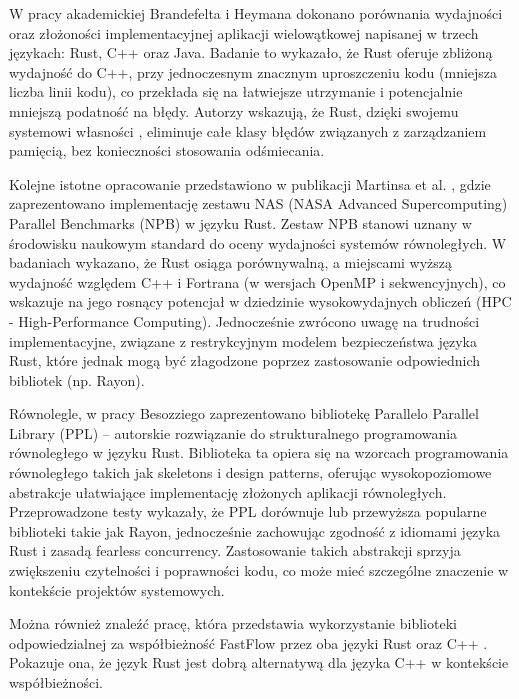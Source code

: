W pracy akademickiej Brandefelta i Heymana \cite{heyman2020comparison} dokonano porównania wydajności oraz złożoności implementacyjnej aplikacji wielowątkowej napisanej w trzech językach: Rust, C++ oraz Java. Badanie to wykazało, że Rust oferuje zbliżoną wydajność do C++, przy jednoczesnym znacznym uproszczeniu kodu (mniejsza liczba linii kodu), co przekłada się na łatwiejsze utrzymanie i potencjalnie mniejszą podatność na błędy. Autorzy wskazują, że Rust, dzięki swojemu systemowi własności , eliminuje całe klasy błędów związanych z zarządzaniem pamięcią, bez konieczności stosowania odśmiecania.

Kolejne istotne opracowanie przedstawiono w publikacji Martinsa et al. \cite{martins2025npbrustnasparallelbenchmarks}, gdzie zaprezentowano implementację zestawu NAS (NASA Advanced Supercomputing) Parallel Benchmarks (NPB) w języku Rust. Zestaw NPB stanowi uznany w środowisku naukowym standard do oceny wydajności systemów równoległych. W badaniach wykazano, że Rust osiąga porównywalną, a miejscami wyższą wydajność względem C++ i Fortrana (w wersjach OpenMP i sekwencyjnych), co wskazuje na jego rosnący potencjał w dziedzinie wysokowydajnych obliczeń (HPC - High-Performance Computing). Jednocześnie zwrócono uwagę na trudności implementacyjne, związane z restrykcyjnym modelem bezpieczeństwa języka Rust, które jednak mogą być złagodzone poprzez zastosowanie odpowiednich bibliotek (np. Rayon).

Równolegle, w pracy Besozziego \cite{Besozzi} zaprezentowano bibliotekę Parallelo Parallel Library (PPL) – autorskie rozwiązanie do strukturalnego programowania równoległego w języku Rust. Biblioteka ta opiera się na wzorcach programowania równoległego takich jak skeletons i design patterns, oferując wysokopoziomowe abstrakcje ułatwiające implementację złożonych aplikacji równoległych. Przeprowadzone testy wykazały, że PPL dorównuje lub przewyższa popularne biblioteki takie jak Rayon, jednocześnie zachowując zgodność z idiomami języka Rust i zasadą fearless concurrency. Zastosowanie takich abstrakcji sprzyja zwiększeniu czytelności i poprawności kodu, co może mieć szczególne znaczenie w kontekście projektów systemowych.

Można również znaleźć pracę, która przedstawia wykorzystanie biblioteki odpowiedzialnej za współbieżność FastFlow przez oba języki Rust oraz C++ \cite{FastFlow}. Pokazuje ona, że język Rust jest dobrą alternatywą dla języka C++ w kontekście współbieżności.

% 


